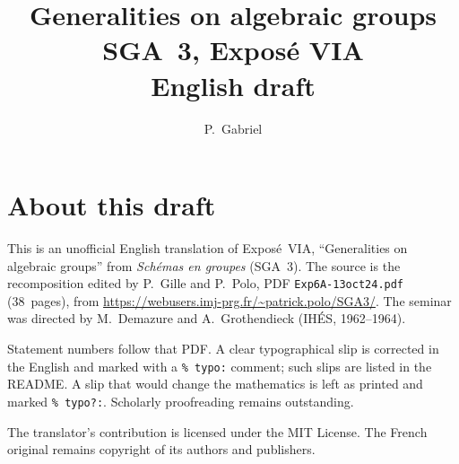 \documentclass[11pt,a4paper,oneside]{amsbook}
\title[SGA~3, Expos\'e VIA (English draft)]{Generalities on algebraic groups\\
{\normalsize SGA~3, Expos\'e VIA\\English draft}}
\author{P.\ Gabriel}
\date{}
\begin{document}
\frontmatter
\maketitle

\chapter*{About this draft}
This is an unofficial English translation of Expos\'e~VIA, ``Generalities on algebraic groups''
from \textit{Sch\'emas en groupes} (SGA~3).
The source is the recomposition edited by P.~Gille and P.~Polo,
PDF \texttt{Exp6A-13oct24.pdf} (38~pages),
from \url{https://webusers.imj-prg.fr/~patrick.polo/SGA3/}.
The seminar was directed by M.~Demazure and A.~Grothendieck
(IH\'ES, 1962--1964).

Statement numbers follow that PDF. A clear typographical slip is
corrected in the English and marked with a \texttt{\% typo:} comment;
such slips are listed in the README. A slip that would change the
mathematics is left as printed and marked \texttt{\% typo?:}.
Scholarly proofreading remains outstanding.

The translator's contribution is licensed under the MIT License.
The French original remains copyright of its authors and publishers.

\tableofcontents
\mainmatter





\end{document}
